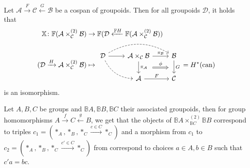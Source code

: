 \begin{prop}
	Let $ \mathcal{ A } \xrightarrow{ F } \mathcal{ C } \xleftarrow{ G } \mathcal{ B } $ be a cospan of groupoids.
	Then for all groupoids $ \mathcal{ D } $, it holds that 
	\begin{align*}
		\mathbb{ X } \colon \mathbb{ F } ( \mathcal{ A } \times^{ ( 2 ) }_{ \mathcal{ C } }\mathcal {B })
		&\to
		\mathbb{ F } ( \mathcal{ D } \xleftarrow{ \mathbb{ F } H } \mathbb{ F } ( \mathcal{ A } \times_{ \mathcal{ C } }^{ ( 2 ) }  \mathcal{ B } ) )		
		\\
		( \mathcal{ D } \xrightarrow{ H } \mathcal{ A } \times_{ \mathcal{ C } }^{ ( 2 ) } \mathcal{ B } ) 
		&\mapsto
		\begin{tikzcd}
			[ampersand replacement=\&]
			\mathcal{ D }
			\ar[r]
			\ar[rr, dashed, bend left]
			\ar[rd, dashed , bend right]
			\&
			\mathcal{ A } \times_{ \mathcal{ C } } \mathcal{ B } 
			\ar[r, " \pi_{ \mathcal{ B } } "]
			\ar[d, " \pi_{ \mathcal{ A } } "]
			\ar[ r , Rightarrow, shift right=7, " \phi"]
			\&
			\mathcal{ B } 
			\ar[d, " G "]
			\\
			\&
			\mathcal{ A } 
			\ar[r, " F "]
			\&
			\mathcal{ C }
		\end{tikzcd}
		=
		H^*( \can )
	\end{align*}
	is an isomorphism. 
\end{prop}

\begin{exmp}
	Let $ A , B , C $ be groups and $ \mathbb{B} A , \mathbb{B} B , \mathbb{B} C $ their associated groupoids, then for group homomorphisms $ A \xrightarrow { f } C  \xleftarrow { g } B $,
	we get that the objects of $ \mathbb{ B } A \times^{ ( 2 ) }_{ \mathbb{ B } C }  \mathbb{ B } B $ correspond to triples $ c_1 = ( *_A , *_B , *_C \xrightarrow{ c \in C } *_C ) $ and a morphism from $ c_1 $ to $ c_2 = ( *_A , *_B , *_C \xrightarrow{ c' \in C } *_C ) $ from correspond to choices $ a \in A , b \in B $ such that $ c' a = b c $.
\end{exmp}



